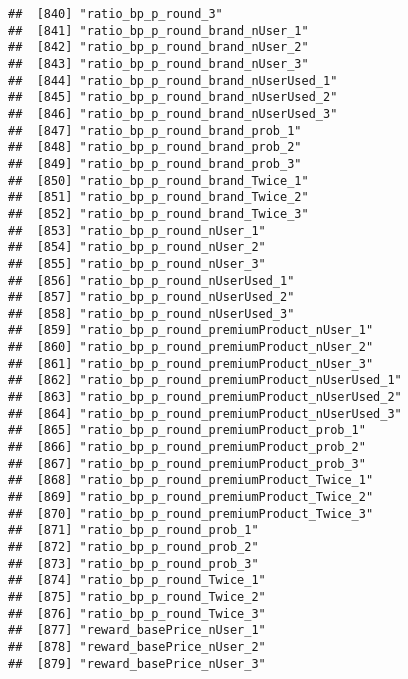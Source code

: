 \documentclass[10pt]{report}
\begin{document}
\begin{verbatim}
##  [840] "ratio_bp_p_round_3"                                   
##  [841] "ratio_bp_p_round_brand_nUser_1"                       
##  [842] "ratio_bp_p_round_brand_nUser_2"                       
##  [843] "ratio_bp_p_round_brand_nUser_3"                       
##  [844] "ratio_bp_p_round_brand_nUserUsed_1"                   
##  [845] "ratio_bp_p_round_brand_nUserUsed_2"                   
##  [846] "ratio_bp_p_round_brand_nUserUsed_3"                   
##  [847] "ratio_bp_p_round_brand_prob_1"                        
##  [848] "ratio_bp_p_round_brand_prob_2"                        
##  [849] "ratio_bp_p_round_brand_prob_3"                        
##  [850] "ratio_bp_p_round_brand_Twice_1"                       
##  [851] "ratio_bp_p_round_brand_Twice_2"                       
##  [852] "ratio_bp_p_round_brand_Twice_3"                       
##  [853] "ratio_bp_p_round_nUser_1"                             
##  [854] "ratio_bp_p_round_nUser_2"                             
##  [855] "ratio_bp_p_round_nUser_3"                             
##  [856] "ratio_bp_p_round_nUserUsed_1"                         
##  [857] "ratio_bp_p_round_nUserUsed_2"                         
##  [858] "ratio_bp_p_round_nUserUsed_3"                         
##  [859] "ratio_bp_p_round_premiumProduct_nUser_1"              
##  [860] "ratio_bp_p_round_premiumProduct_nUser_2"              
##  [861] "ratio_bp_p_round_premiumProduct_nUser_3"              
##  [862] "ratio_bp_p_round_premiumProduct_nUserUsed_1"          
##  [863] "ratio_bp_p_round_premiumProduct_nUserUsed_2"          
##  [864] "ratio_bp_p_round_premiumProduct_nUserUsed_3"          
##  [865] "ratio_bp_p_round_premiumProduct_prob_1"               
##  [866] "ratio_bp_p_round_premiumProduct_prob_2"               
##  [867] "ratio_bp_p_round_premiumProduct_prob_3"               
##  [868] "ratio_bp_p_round_premiumProduct_Twice_1"              
##  [869] "ratio_bp_p_round_premiumProduct_Twice_2"              
##  [870] "ratio_bp_p_round_premiumProduct_Twice_3"              
##  [871] "ratio_bp_p_round_prob_1"                              
##  [872] "ratio_bp_p_round_prob_2"                              
##  [873] "ratio_bp_p_round_prob_3"                              
##  [874] "ratio_bp_p_round_Twice_1"                             
##  [875] "ratio_bp_p_round_Twice_2"                             
##  [876] "ratio_bp_p_round_Twice_3"                             
##  [877] "reward_basePrice_nUser_1"                             
##  [878] "reward_basePrice_nUser_2"                             
##  [879] "reward_basePrice_nUser_3"                             

\end{verbatim}
\end{document}
